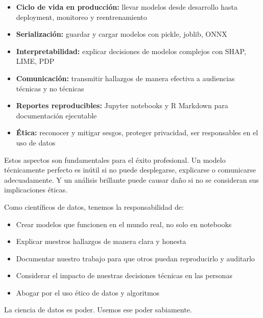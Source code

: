 \documentclass[11pt,a4paper]{article}
\begin{document}
\begin{itemize}
\item \textbf{Ciclo de vida en producción:} llevar modelos desde desarrollo hasta deployment, monitoreo y reentrenamiento
\item \textbf{Serialización:} guardar y cargar modelos con pickle, joblib, ONNX
\item \textbf{Interpretabilidad:} explicar decisiones de modelos complejos con SHAP, LIME, PDP
\item \textbf{Comunicación:} transmitir hallazgos de manera efectiva a audiencias técnicas y no técnicas
\item \textbf{Reportes reproducibles:} Jupyter notebooks y R Markdown para documentación ejecutable
\item \textbf{Ética:} reconocer y mitigar sesgos, proteger privacidad, ser responsables en el uso de datos
\end{itemize}

Estos aspectos son fundamentales para el éxito profesional. Un modelo técnicamente perfecto es inútil si no puede desplegarse, explicarse o comunicarse adecuadamente. Y un análisis brillante puede causar daño si no se consideran sus implicaciones éticas.

Como científicos de datos, tenemos la responsabilidad de:
\begin{itemize}
\item Crear modelos que funcionen en el mundo real, no solo en notebooks
\item Explicar nuestros hallazgos de manera clara y honesta
\item Documentar nuestro trabajo para que otros puedan reproducirlo y auditarlo
\item Considerar el impacto de nuestras decisiones técnicas en las personas
\item Abogar por el uso ético de datos y algoritmos
\end{itemize}

La ciencia de datos es poder. Usemos ese poder sabiamente.
\end{document}
